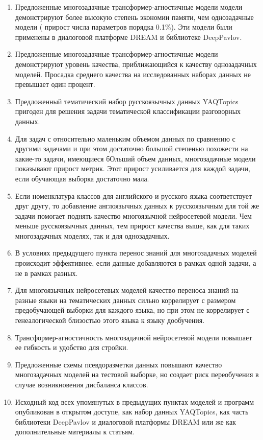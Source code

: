 \begin{enumerate}
\item Предложенные многозадачные трансформер-агностичные модели модели демонстрируют более высокую степень экономии памяти, чем однозадачные модели ( прирост числа параметров порядка 0.1\%). Эти модели были применены в диалоговой платформе {DREAM} и библиотеке DeepPavlov.
\item Предложенные многозадачные трансформер-агностичные модели демонстрируют уровень качества, приближающийся к качеству однозадачных моделей. Просадка среднего качества на исследованных наборах данных не превышает один процент.
\item Предложенный тематический набор русскоязычных данных {YAQTopics} пригоден для решения задачи тематической классификации разговорных данных.
\item Для задач с относительно маленьким объемом данных по сравнению с другими задачами и при этом достаточно большой степенью похожести на какие-то задачи, имеющиеся бОльший объем данных, многозадачные модели показывают прирост метрик. Этот прирост усиливается для каждой задачи, если обучающая выборка достаточно мала.
\item Если номенклатура классов для английского и русского языка соответствует друг другу, то добавление англоязычных данных к русскоязычным для той же задачи помогает поднять качество многоязычной нейросетевой модели. Чем меньше русскоязычных данных, тем прирост качества выше, как для таких многозадачных моделях, так и для однозадачных.
\item В условиях предыдущего пункта перенос знаний для многозадачных моделей происходит эффективнее, если данные добавляются в рамках одной задачи, а не в рамках разных.
\item Для многоязычных нейросетевых моделей качество переноса знаний на разные языки на тематических данных сильно коррелирует с размером предобучающей выборки для каждого языка, но при этом не коррелирует с генеалогической близостью этого языка к языку дообучения.
\item Трансформер-агностичность многозадачной нейросетевой модели повышает ее гибкость и удобство для стройки.
\item Предложенные схемы псевдоразметки данных повышают качество многозадачных моделей на тестовой выборке, но создает риск переобучения в случае возникновения дисбаланса классов.
  \item Исходный код всех упомянутых в предыдущих пунктах моделей и программ опубликован в открытом доступе, как набор данных YAQTopics, как часть библиотеки DeepPavlov и диалоговой платформы {DREAM} или же как дополнительные материалы к статьям.
\end{enumerate}
